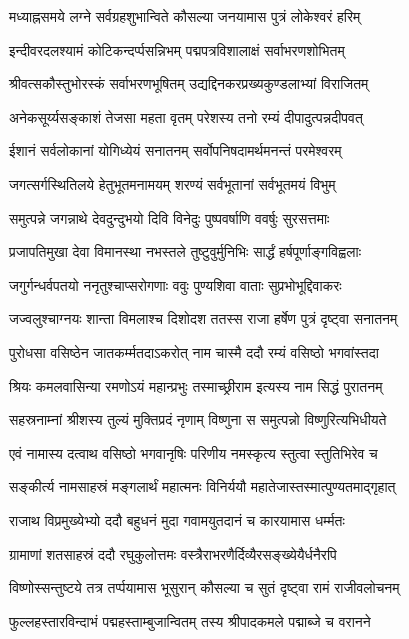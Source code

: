 \twolineshloka
{मध्याह्नसमये लग्ने सर्वग्रहशुभान्विते}
{कौसल्या जनयामास पुत्रं लोकेश्वरं हरिम्}%

\twolineshloka
{इन्दीवरदलश्यामं कोटिकन्दर्प्पसन्निभम्}
{पद्मपत्रविशालाक्षं सर्वाभरणशोभितम्}%

\twolineshloka
{श्रीवत्सकौस्तुभोरस्कं सर्वाभरणभूषितम्}
{उद्यद्दिनकरप्रख्यकुण्डलाभ्यां विराजितम्}%

\twolineshloka
{अनेकसूर्य्यसङ्काशं तेजसा महता वृतम्}
{परेशस्य तनो रम्यं दीपादुत्पन्नदीपवत्}%

\twolineshloka
{ईशानं सर्वलोकानां योगिध्येयं सनातनम्}
{सर्वोपनिषदामर्थमनन्तं परमेश्वरम्}%

\twolineshloka
{जगत्सर्गस्थितिलये हेतुभूतमनामयम्}
{शरण्यं सर्वभूतानां सर्वभूतमयं विभुम्}%

\twolineshloka
{समुत्पन्ने जगन्नाथे देवदुन्दुभयो दिवि}
{विनेदुः पुष्पवर्षाणि ववर्षुः सुरसत्तमाः}%

\twolineshloka
{प्रजापतिमुखा देवा विमानस्था नभस्तले}
{तुष्टुवुर्मुनिभिः सार्द्धं हर्षपूर्णाङ्गविह्वलाः}%

\twolineshloka
{जगुर्गन्धर्वपतयो ननृतुश्चाप्सरोगणाः}
{ववुः पुण्यशिवा वाताः सुप्रभोभूद्दिवाकरः}%

\twolineshloka
{जज्वलुश्चाग्नयः शान्ता विमलाश्च दिशोदश}
{ततस्स राजा हर्षेण पुत्रं दृष्ट्वा सनातनम्}%

\twolineshloka
{पुरोधसा वसिष्ठेन जातकर्म्मतदाऽकरोत्}
{नाम चास्मै ददौ रम्यं वसिष्ठो भगवांस्तदा}%

\twolineshloka
{श्रियः कमलवासिन्या रमणोऽयं महान्प्रभुः}
{तस्माच्छ्रीराम इत्यस्य नाम सिद्धं पुरातनम्}%

\twolineshloka
{सहस्रनाम्नां श्रीशस्य तुल्यं मुक्तिप्रदं नृणाम्}
{विष्णुना स समुत्पन्नो विष्णुरित्यभिधीयते}%

\twolineshloka
{एवं नामास्य दत्वाथ वसिष्ठो भगवानृषिः}
{परिणीय नमस्कृत्य स्तुत्वा स्तुतिभिरेव च}%

\twolineshloka
{सङ्कीर्त्य नामसाहस्रं मङ्गलार्थं महात्मनः}
{विनिर्ययौ महातेजास्तस्मात्पुण्यतमाद्गृहात्}%

\twolineshloka
{राजाथ विप्रमुख्येभ्यो ददौ बहुधनं मुदा}
{गवामयुतदानं च कारयामास धर्म्मतः}%

\twolineshloka
{ग्रामाणां शतसाहस्रं ददौ रघुकुलोत्तमः}
{वस्त्रैराभरणैर्दिव्यैरसङ्ख्येयैर्धनैरपि}%

\twolineshloka
{विष्णोस्सन्तुष्टये तत्र तर्प्पयामास भूसुरान्}
{कौसल्या च सुतं दृष्ट्वा रामं राजीवलोचनम्}%

\twolineshloka
{फुल्लहस्तारविन्दाभं पद्महस्ताम्बुजान्वितम्}
{तस्य श्रीपादकमले पद्माब्जे च वरानने}%

